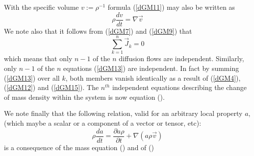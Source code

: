 With the specific volume $v:=\rho^{-1}$ formula (\ref{dGM11}) may also be written as
\begin{equation}
\rho \frac{dv}{dt} = \nabla \vec{v}
\label{dGM14}
\end{equation}
We note also that it follows from (\ref{dGM7}) and (\ref{dGM9}) that 
\begin{equation}
\sum_{k=1}^n \vec{J}_k =0 
\label{dGM15}
\end{equation}
which means that only $n-1$ of the $n$ diffusion flows are independent.
Similarly, only $n-1$ of the $n$ equations (\ref{dGM13}) are independent. In fact by summing (\ref{dGM13}) over all $k$, both members vanish identically as a result of (\ref{dGM4}), (\ref{dGM12}) and (\ref{dGM15}). The $n^{th}$ independent equations describing the change of mass density within the system is now equation (\label{dGM14}).

We note finally that the following relation, valid for an arbitrary local property $a$, (which maybe a scalar or a component of a vector or tensor, etc):
\begin{equation}
\rho \frac{da}{dt} = \frac{\partial a\rho}{\partial t} + \nabla ( a \rho \vec{v})
\label{dGM16}
\end{equation}
is a consequence of the mass equation (\label{dGM5}) and of (\label{dGM8})